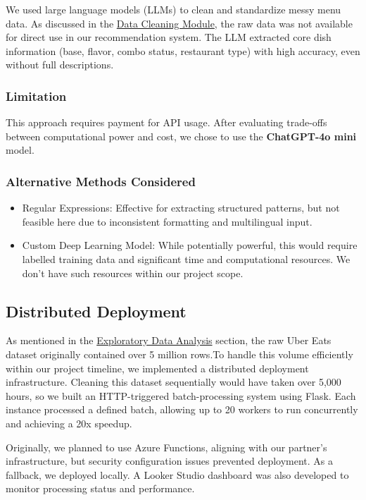 \documentclass[
  11pt,
  a4paper,
  DIV=11,
  numbers=noendperiod]{scrartcl}
\providecommand{\tightlist}{%
  \setlength{\itemsep}{0pt}\setlength{\parskip}{0pt}}\usepackage{longtable,booktabs,array}
\begin{document}
We used large language models (LLMs) to clean and standardize messy menu
data. As discussed in the \hyperref[data-cleaning-module]{Data Cleaning
Module}, the raw data was not available for direct use in our
recommendation system. The LLM extracted core dish information (base,
flavor, combo status, restaurant type) with high accuracy, even without
full descriptions.

\subsubsection{Limitation}\label{limitation}

This approach requires payment for API usage. After evaluating
trade-offs between computational power and cost, we chose to use the
\textbf{ChatGPT-4o mini} model.

\subsubsection{Alternative Methods
Considered}\label{alternative-methods-considered}

\begin{itemize}
\tightlist
\item
  Regular Expressions: Effective for extracting structured patterns, but
  not feasible here due to inconsistent formatting and multilingual
  input.
\item
  Custom Deep Learning Model: While potentially powerful, this would
  require labelled training data and significant time and computational
  resources. We don't have such resources within our project scope.
\end{itemize}

\subsection{Distributed Deployment}\label{distributed-deployment}

As mentioned in the \hyperref[exploratory-data-analysis]{Exploratory
Data Analysis} section, the raw Uber Eats dataset originally contained
over 5 million rows.To handle this volume efficiently within our project
timeline, we implemented a distributed deployment infrastructure.
Cleaning this dataset sequentially would have taken over 5,000 hours, so
we built an HTTP-triggered batch-processing system using Flask. Each
instance processed a defined batch, allowing up to 20 workers to run
concurrently and achieving a 20x speedup.

Originally, we planned to use Azure Functions, aligning with our
partner's infrastructure, but security configuration issues prevented
deployment. As a fallback, we deployed locally. A Looker Studio
dashboard was also developed to monitor processing status and
performance.
\end{document}
